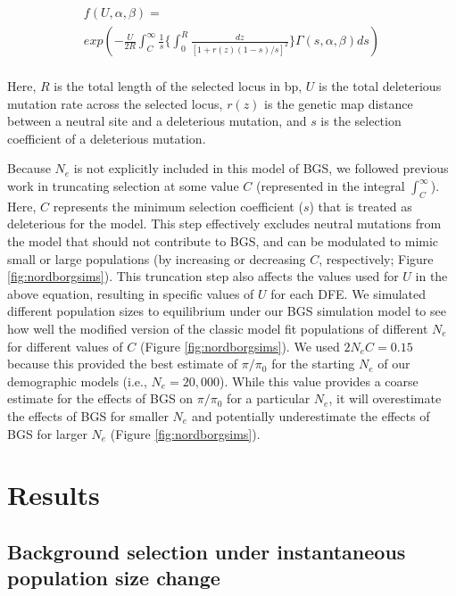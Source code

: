 \documentclass[9pt,twocolumn,twoside]{rilabRxiv}
\begin{document}
\begin{equation*}
    \begin{align}
        f(U,\alpha,\beta)=\\
    exp\left( -\frac{U}{2R}\int^{\infty}_C\frac{1}{s}\bigg\{\int_0^R\frac{dz}{[1+r(z)(1-s)/s]^2}\bigg\}\Gamma(s,\alpha,\beta)ds \right)\\
    \end{align}
\end{equation*}
    
Here, $R$ is the total length of the selected locus in bp, $U$ is the total deleterious mutation rate across the selected locus, $r(z)$ is the genetic map distance between a neutral site and a deleterious mutation, and $s$ is the selection coefficient of a deleterious mutation.

Because $N_e$ is not explicitly included in this model of BGS, we followed previous work \citep{charlesworth2012role, comeron2014background} in truncating selection at some value $C$ (represented in the integral $\int^{\infty}_C$).
Here, $C$ represents the minimum selection coefficient ($s$) that is treated as deleterious for the model.
This step effectively excludes neutral mutations from the model that should not contribute to BGS, and can be modulated to mimic small or large populations (by increasing or decreasing $C$, respectively; Figure \ref{fig:nordborgsims}).
This truncation step also affects the values used for $U$ in the above equation, resulting in specific values of $U$ for each DFE.
We simulated different population sizes to equilibrium under our BGS simulation model to see how well the modified version of the classic model fit populations of different $N_e$ for different values of $C$ (Figure \ref{fig:nordborgsims}).
We used $2N_e C = 0.15$ because this provided the best estimate of $\pi/\pi_0$ for the starting $N_e$ of our demographic models (i.e., $N_e = 20,000$).
While this value provides a coarse estimate for the effects of BGS on $\pi/\pi_0$ for a particular $N_e$, it will overestimate the effects of BGS for smaller $N_e$ and potentially underestimate the effects of BGS for larger $N_e$ (Figure \ref{fig:nordborgsims}).

\section{Results}

\subsection{Background selection under instantaneous population size change}
\end{document}
